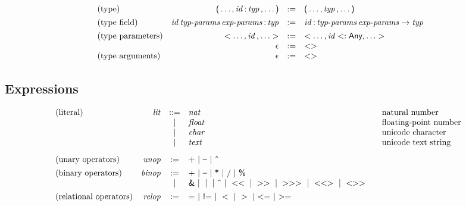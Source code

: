 $$
\begin{array}{@{}lrcl@{}}
\text{(type)} &
\K( \dots \K, \x{id} \K: \x{typ} \K, \dots \K) &:=&
  \K( \dots \K, \x{typ} \K, \dots \K) \\
[1ex]
\text{(type field)} &
\x{id} \x{typ-params} \x{exp-params} \K: \x{typ} &:=&
  \x{id} \K: \x{typ-params} \x{exp-params} \Kto \x{typ} \\
[1ex]
\text{(type parameters)} &
\Klt \dots \K, \x{id} \K, \dots \Kgt &:=&
  \Klt \dots \K, \x{id} \Ksub \K{Any} \K, \dots \Kgt \\&
\epsilon &:=&
  \Klt \Kgt \\
\text{(type arguments)} &
\epsilon &:=&
  \Klt \Kgt \\
\end{array}
$$


\subsection*{Expressions}

$$
\begin{array}{@{}lrcl@{\qquad}l}
\text{(literal)} & \x{lit} &::=&
  \x{nat}
    & \text{natural number} \\&&|&
  \x{float}
    & \text{floating-point number} \\&&|&
  \x{char}
    & \text{unicode character} \\&&|&
  \x{text}
    & \text{unicode text string} \\
[2ex]
\text{(unary operators)} & \x{unop} &:=&
  \K{+} ~|~ \K\textendash ~|~ \K{\^{}} \\
[1ex]
\text{(binary operators)} & \x{binop} &:=&
  \K{+} ~|~ \K\textendash ~|~ \K{*} ~|~ \K{/} ~|~ \K{\%} \\&&|&
  \K{\&} ~|~ \;\K\textbar\; ~|~ \K{\^{}} ~|~ \Klt\Klt ~|~ \Kgt\Kgt ~|~ \Kgt\Kgt\Kgt ~|~ \Klt\Klt\Kgt ~|~ \Klt\Kgt\Kgt \\
[1ex]
\text{(relational operators)} & \x{relop} &:=&
  \K= ~|~ \K{!=} ~|~ \Klt ~|~ \Kgt ~|~ {\Klt}{\K=} ~|~ {\Kgt}{\K=} \\
\end{array}
$$

